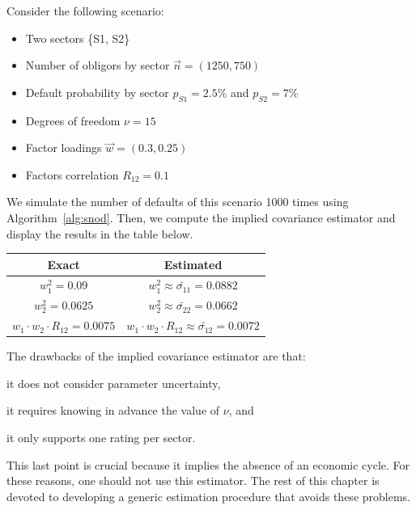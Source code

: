 \documentclass[11pt,fleqn]{book} %
\begin{document}
\begin{example}
	Consider the following scenario:
	\begin{itemize}
		\item Two sectors \{S1, S2\}
		\item Number of obligors by sector $\vec{n} = (1250, 750)$
		\item Default probability by sector $p_{S1} = 2.5\%$ and $p_{S2} = 7\%$
		\item Degrees of freedom $\nu = 15$
		\item Factor loadings $\vec{w} = (0.3, 0.25)$
		\item Factors correlation $R_{12} = 0.1$
	\end{itemize}
	We simulate the number of defaults of this scenario \num{1000} times using 
	Algorithm~\ref{alg:snod}. Then, we compute the implied covariance estimator 
	and display the results in the table below.

	\hspace*{1cm}
	\begin{tabular}{|c|c|}
		\hline
		Exact & Estimated \\
		\hline
		$w_1^2 = 0.09$ & $w_1^2 \approx \widetilde{\sigma_{11}} = 0.0882$ \\
		\hline
		$w_2^2 = 0.0625$ & $w_2^2 \approx \widetilde{\sigma_{22}} = 0.0662$ \\
		\hline
		$w_1 \cdot w_2 \cdot R_{12} = 0.0075$ & $w_1 \cdot w_2 \cdot R_{12} \approx \widetilde{\sigma_{12}} = 0.0072$ \\
		\hline
	\end{tabular}
\end{example}

The drawbacks of the implied covariance estimator are that:
\begin{inparaenum}[1)]
	\item it does not consider parameter uncertainty, 
	\item it requires knowing in advance the value of $\nu$, and
	\item it only supports one rating per sector.
\end{inparaenum}
This last point is crucial because it implies the absence of an economic 
cycle. For these reasons, one should not use this estimator. The rest of 
this chapter is devoted to developing a generic estimation procedure that 
avoids these problems.

\end{document}
